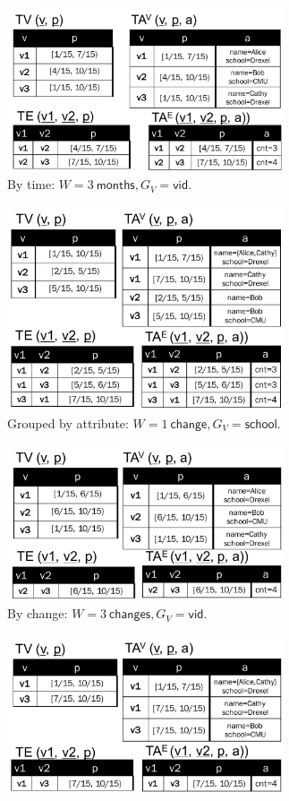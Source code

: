 \begin{figure}[t]
\begin{subfigure}[b]{0.5\textwidth}
\includegraphics[width=3.2in]{figs/agg1.pdf}
\caption{By time: $W=3~\textsf{months}, G_V=\textsf{vid}$.}
\label{fig:tg_agg1}
\end{subfigure}
\begin{subfigure}[b]{0.5\textwidth}
\includegraphics[width=3.2in]{figs/agg3.pdf}
\caption{Grouped by attribute: $W=1~\textsf{change}, G_V=\textsf{school}$.}
\label{fig:tg_agg3}
\end{subfigure}
\begin{subfigure}[b]{0.5\textwidth}
\includegraphics[width=3.2in]{figs/agg2.pdf}
\caption{By change: $W=3~\textsf{changes}, G_V=\textsf{vid}$.}
\label{fig:tg_agg2}
\end{subfigure}
\begin{subfigure}[b]{0.5\textwidth}
\includegraphics[width=3.2in]{figs/agg4.pdf}

\end{subfigure}
\end{figure}

